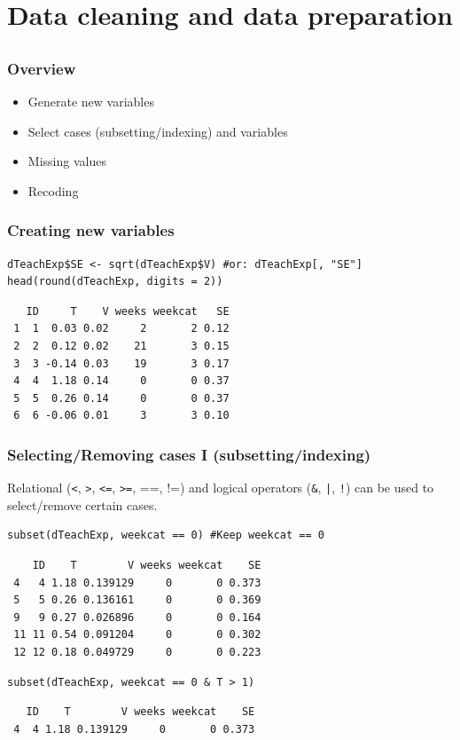 \documentclass[bigger]{beamer}
\begin{document}
\section{Data cleaning and data preparation}
\label{sec-4}
\subsection{}
\begin{frame}
\frametitle{Overview}
\label{sec-4-1-1}

\begin{itemize}
\item Generate new variables
\item Select cases (subsetting/indexing) and variables
\item Missing values
\item Recoding
\end{itemize}
\end{frame}
\begin{frame}[fragile,shrink=10]
\frametitle{Creating new variables}
\label{sec-4-1-2}


\lstset{language=R}
\begin{lstlisting}
dTeachExp$SE <- sqrt(dTeachExp$V) #or: dTeachExp[, "SE"]
head(round(dTeachExp, digits = 2))
\end{lstlisting}

\begin{verbatim}
   ID     T    V weeks weekcat   SE
 1  1  0.03 0.02     2       2 0.12
 2  2  0.12 0.02    21       3 0.15
 3  3 -0.14 0.03    19       3 0.17
 4  4  1.18 0.14     0       0 0.37
 5  5  0.26 0.14     0       0 0.37
 6  6 -0.06 0.01     3       3 0.10
\end{verbatim}
\end{frame}
\begin{frame}[fragile]
\frametitle{Selecting/Removing cases I (subsetting/indexing)}
\label{sec-4-1-3}

    Relational (\texttt{<}, \texttt{>}, \texttt{<=}, \texttt{>=}, ==, !=) and logical operators (\texttt{\&}, \texttt{|}, \texttt{!}) can be used to select/remove certain cases.

\lstset{language=R}
\begin{lstlisting}
subset(dTeachExp, weekcat == 0) #Keep weekcat == 0
\end{lstlisting}

\begin{verbatim}
    ID    T        V weeks weekcat    SE
 4   4 1.18 0.139129     0       0 0.373
 5   5 0.26 0.136161     0       0 0.369
 9   9 0.27 0.026896     0       0 0.164
 11 11 0.54 0.091204     0       0 0.302
 12 12 0.18 0.049729     0       0 0.223
\end{verbatim}



\lstset{language=R}
\begin{lstlisting}
subset(dTeachExp, weekcat == 0 & T > 1)
\end{lstlisting}

\begin{verbatim}
   ID    T        V weeks weekcat    SE
 4  4 1.18 0.139129     0       0 0.373
\end{verbatim}
\end{frame}
\end{document}
